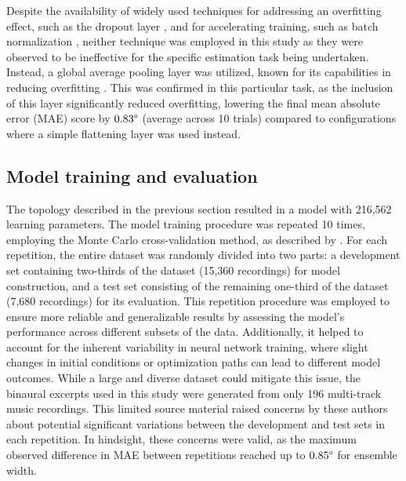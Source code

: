 \documentclass[11pt]{article}
\begin{document}
Despite the availability of widely used techniques for addressing  an overfitting effect, such as the dropout layer \parencite{srivastava_dropout_2014}, and for accelerating training, such as batch normalization \parencite{ioffe_batch_2015}, neither technique was employed in this study as they were observed to be ineffective for the specific estimation task being undertaken. Instead, a global average pooling layer was utilized, known for its capabilities in reducing overfitting \parencite{lin_network_2013}. This was confirmed in this particular task, as the inclusion of this layer significantly reduced overfitting, lowering the final mean absolute error (MAE) score by $0.83\degree$ (average across 10 trials) compared to configurations where a simple flattening layer was used instead.

\subsection{Model training and evaluation}
\label{subsec:training_evaluation}

The topology described in the previous section resulted in a model with 216,562 learning parameters. The model training procedure was repeated 10 times, employing the Monte Carlo cross-validation method, as described by \textcite{kuhn_applied_2013}. For each repetition, the entire dataset was randomly divided into two parts: a development set containing two-thirds of the dataset (15,360 recordings) for model construction, and a test set consisting of the remaining one-third of the dataset (7,680 recordings) for its evaluation. This repetition procedure was employed to ensure more reliable and generalizable results by assessing the model's performance across different subsets of the data. Additionally, it helped to account for the inherent variability in neural network training, where slight changes in initial conditions or optimization paths can lead to different model outcomes. While a large and diverse dataset could mitigate this issue, the binaural excerpts used in this study were generated from only 196 multi-track music recordings. This limited source material raised concerns by these authors about potential significant variations between the development and test sets in each repetition. In hindsight, these concerns were valid, as the maximum observed difference in MAE between repetitions reached up to $0.85\degree$ for ensemble width.
\end{document}
